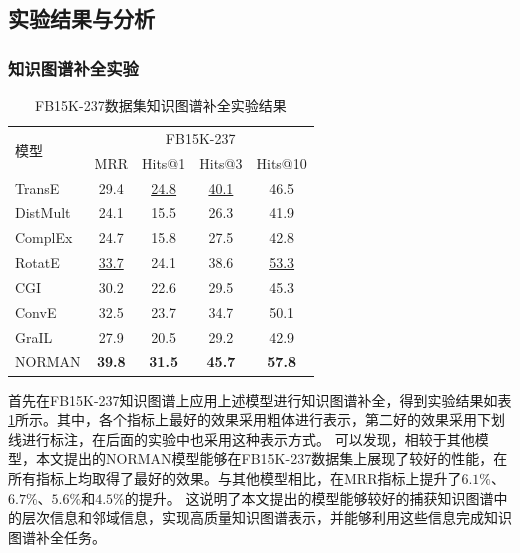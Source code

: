 \documentclass[algorithmlist, AutoFakeBold, AutoFakeSlant, figurelist, tablelist, nomlist, engineering, openany]{seuthesix} %
\begin{document}
\subsection{实验结果与分析}
\subsubsection{知识图谱补全实验}
\begin{table}[t]
  \centering
  \caption{FB15K-237数据集知识图谱补全实验结果}
  \begin{tabular*}{0.95\textwidth}{@{\extracolsep{\fill}}lcccc}
    \toprule[1pt]
    \multirow{2}{*}{模型} & \multicolumn{4}{c}{FB15K-237} \\
      & MRR & Hits@1 & Hits@3 & Hits@10 \\ \hline
    TransE & 29.4 & \underline{24.8} & \underline{40.1} & 46.5 \\
    DistMult & 24.1 & 15.5 & 26.3 & 41.9 \\
    ComplEx & 24.7 & 15.8 & 27.5 & 42.8 \\
    RotatE & \underline{33.7} & 24.1 & 38.6  & \underline{53.3} \\
    CGI & 30.2 & 22.6 & 29.5 & 45.3 \\
    ConvE & 32.5 & 23.7 & 34.7 & 50.1 \\
    GraIL & 27.9 & 20.5 & 29.2 & 42.9 \\
    NORMAN & \textbf{39.8} & \textbf{31.5} & \textbf{45.7} & \textbf{57.8} \\
    \bottomrule[1pt]
  \end{tabular*}
  \label{Experiment1_FB15K-237}
\end{table}

首先在FB15K-237知识图谱上应用上述模型进行知识图谱补全，得到实验结果如表\ref{Experiment1_FB15K-237}所示。其中，各个指标上最好的效果采用粗体进行表示，第二好的效果采用下划线进行标注，在后面的实验中也采用这种表示方式。
可以发现，相较于其他模型，本文提出的NORMAN模型能够在FB15K-237数据集上展现了较好的性能，在所有指标上均取得了最好的效果。与其他模型相比，在MRR指标上提升了$6.1\%$、$6.7\%$、$5.6\%$和$4.5\%$的提升。
这说明了本文提出的模型能够较好的捕获知识图谱中的层次信息和邻域信息，实现高质量知识图谱表示，并能够利用这些信息完成知识图谱补全任务。
\end{document}
